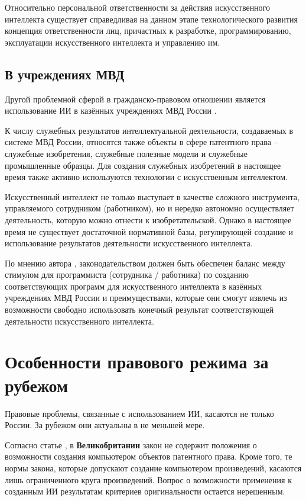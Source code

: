 Относительно персональной ответственности за действия искусственного интеллекта существует справедливая
на данном этапе технологического развития концепция ответственности лиц, причастных к разработке,
программированию, эксплуатации искусственного интеллекта и управлению им.

\subsection{В учреждениях МВД}
Другой проблемной сферой в гражданско-правовом отношении является использование ИИ в казённых
учреждениях МВД России \cite{civil}.

К числу служебных результатов интеллектуальной деятельности, создаваемых в системе МВД России,
относятся также объекты в сфере патентного права – служебные изобретения, служебные полезные модели
и служебные промышленные образцы. Для создания служебных изобретений в настоящее время также активно
используются технологии с искусственным интеллектом.

Искусственный интеллект не только выступает в
качестве сложного инструмента, управляемого сотрудником (работником), но и нередко автономно
осуществляет деятельность, которую можно отнести к изобретательской. Однако в настоящее время
не существует достаточной нормативной базы, регулирующей создание и использование
результатов деятельности искусственного интеллекта.

По мнению автора \cite{civil},
законодательством должен быть обеспечен баланс между стимулом для программиста (сотрудника / работника)
по созданию соответствующих программ для искусственного интеллекта в казённых учреждениях МВД России
и преимуществами, которые они смогут извлечь из возможности свободно
использовать конечный результат соответствующей деятельности искусственного интеллекта.

\newpage
\section{Особенности правового режима за рубежом}
Правовые проблемы, связанные с использованием ИИ, касаются не только России. За рубежом они
актуальны в не меньшей мере.

Согласно статье \cite{abr}, в \textbf{Великобритании} закон не содержит  положения о возможности создания
компьютером объектов патентного права. Кроме того, те нормы закона, которые допускают создание компьютером
произведений, касаются лишь ограниченного круга произведений. Вопрос о возможности применения к созданным
ИИ результатам критериев оригинальности остается нерешенным.


